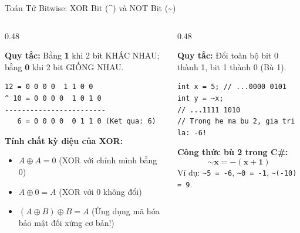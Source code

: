 \documentclass[aspectratio=169, 10pt]{beamer}
\begin{document}
\begin{frame}[fragile]{Toán Tử Bitwise: XOR Bit (\textasciicircum) và NOT Bit (\textasciitilde)}
  \begin{columns}[T]
    \begin{column}{0.48\textwidth}
      \begin{tcolorbox}[colback=UniLightBlue!30,colframe=UniBlue,title=\textbf{Phép XOR Bit (\textasciicircum): Đảo Trạng Thái},fonttitle=\small\bfseries]
        \textbf{Quy tắc:} Bằng \textbf{1} khi 2 bit KHÁC NHAU; bằng \textbf{0} khi 2 bit GIỐNG NHAU.
\begin{lstlisting}[numbers=none]
  12 = 0 0 0 0  1 1 0 0
^ 10 = 0 0 0 0  1 0 1 0
------------------------
   6 = 0 0 0 0  0 1 1 0 (Ket qua: 6)
\end{lstlisting}
        \textbf{Tính chất kỳ diệu của XOR:}
        \begin{itemize}\footnotesize
          \item $A \oplus A = 0$ (XOR với chính mình bằng 0)
          \item $A \oplus 0 = A$ (XOR với 0 không đổi)
          \item $(A \oplus B) \oplus B = A$ (Ứng dụng mã hóa bảo mật đối xứng cơ bản!)
        \end{itemize}
      \end{tcolorbox}
    \end{column}

    \begin{column}{0.48\textwidth}
      \begin{tcolorbox}[colback=AlertRed!10,colframe=AlertRed,title=\textbf{Phép NOT Bit (\textasciitilde): Đảo Tất Cả Bit},fonttitle=\small\bfseries]
        \textbf{Quy tắc:} Đổi toàn bộ bit 0 thành 1, bit 1 thành 0 (Bù 1).
\begin{lstlisting}[numbers=none]
int x = 5; // ...0000 0101
int y = ~x;
// ...1111 1010
// Trong he ma bu 2, gia tri la: -6!
\end{lstlisting}
        \begin{alertblock}{\textbf{Công thức bù 2 trong C\#:}}
          $$\mathbf{\sim x = -(x + 1)}$$
          Ví dụ: \texttt{\textasciitilde 5 = -6}, \texttt{\textasciitilde 0 = -1}, \texttt{\textasciitilde(-10) = 9}.
        \end{alertblock}
      \end{tcolorbox}
    \end{column}
  \end{columns}
\end{frame}
\end{document}
